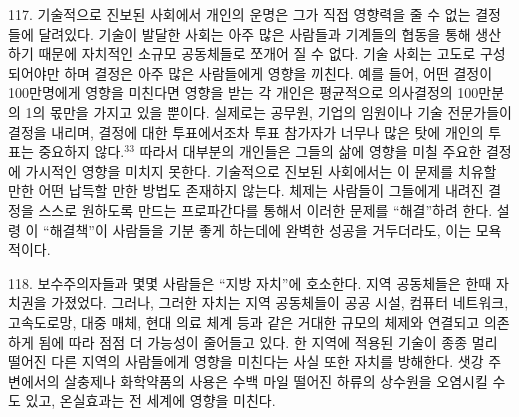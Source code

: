\documentclass[11pt,a4paper]{article}
\begin{document}
\begin{multicols}{2}
117. 기술적으로 진보된 사회에서 개인의 운명은 그가 직접 영향력을 줄 수 없는 결정들에 달려있다.  기술이 발달한 사회는 아주 많은 사람들과 기계들의 협동을 통해 생산하기 때문에 자치적인 소규모  공동체들로 쪼개어 질 수 없다. 기술 사회는 고도로 구성되어야만 하며 결정은 아주 많은 사람들에게  영향을 끼친다. 예를 들어, 어떤 결정이 100만명에게 영향을 미친다면 영향을 받는 각 개인은 평균적으로 의사결정의 100만분의 1의 몫만을 가지고 있을 뿐이다. 실제로는 공무원, 기업의 임원이나 기술  전문가들이 결정을 내리며, 결정에 대한 투표에서조차 투표 참가자가 너무나 많은 탓에 개인의 투표는  중요하지 않다.\hyperlink{33}{$^{33}$} 따라서 대부분의 개인들은 그들의 삶에 영향을 미칠 주요한 결정에 가시적인 영향을  미치지 못한다. 기술적으로 진보된 사회에서는 이 문제를 치유할 만한 어떤 납득할 만한 방법도 존재하지  않는다. 체제는 사람들이 그들에게 내려진 결정을 스스로 원하도록 만드는 프로파간다를 통해서 이러한  문제를 “해결”하려 한다. 설령 이 “해결책”이 사람들을 기분 좋게 하는데에 완벽한 성공을 거두더라도,  이는 모욕적이다. 


118. 보수주의자들과 몇몇 사람들은 “지방 자치”에 호소한다. 지역 공동체들은 한때 자치권을 가졌었다.  그러나, 그러한 자치는 지역 공동체들이 공공 시설, 컴퓨터 네트워크, 고속도로망, 대중 매체, 현대 의료 체계 등과 같은 거대한 규모의 체제와 연결되고 의존하게 됨에 따라 점점 더 가능성이 줄어들고 있다. 한  지역에 적용된 기술이 종종 멀리 떨어진 다른 지역의 사람들에게 영향을 미친다는 사실 또한 자치를  방해한다. 샛강 주변에서의 살충제나 화학약품의 사용은 수백 마일 떨어진 하류의 상수원을 오염시킬  수도 있고, 온실효과는 전 세계에 영향을 미친다.  



\end{multicols}
\end{document}
